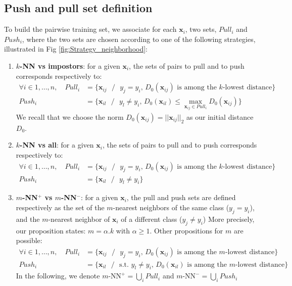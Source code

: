 \subsection{Push and pull set definition}
To build the pairwise training set, we associate for each $\textbf{x}_i$, two sets, $Pull_i$ and $Push_i$, where the two sets are chosen according to one of the following strategies, illustrated in Fig \ref{fig:Strategy_neighborhood}: 
\begin{enumerate}
	\item \textbf{$k$-NN vs impostors}: for a given $\textbf{x}_i$, the sets of pairs to pull and to push corresponds respectively to:
	\begin{align}
		\forall i\in 1, \ldots, n, \quad Pull_i & = \{\textbf{x}_{ij} \text{ } / \text{ }  \text{$y_j = y_i$, $D_0(\textbf{x}_{ij})$ is among the $k$-lowest distance} \} \label{eq:pull1}\\
		Push_i & = \{\textbf{x}_{il} \text{ } / \text{ } \text{$y_l \neq y_i$, } D_0(\textbf{x}_{il}) \leq \max\limits_{\textbf{x}_{ij} \in Pull_i} D_0(\textbf{x}_{ij})\} \label{eq:push1}
	\end{align}
	We recall that we choose the norm $D_0(\textbf{x}_{ij}) = ||\textbf{x}_{ij}||_2$ as our initial distance $D_0$.
	\item \textbf{$k$-NN vs all}: for a given $\textbf{x}_i$, the sets of pairs to pull and to push corresponds respectively to:	
	\begin{align}
	\forall i\in 1, \ldots, n, \quad Pull_i & = \{\textbf{x}_{ij} \text{ } / \text{ } \text{$y_j = y_i$, $D_0(\textbf{x}_{ij})$ is among the $k$-lowest distance} \} \\
	Push_i & = \{\textbf{x}_{il} \text{ } / \text{ } \text{$y_l \neq y_i$} \}
	\end{align}
	\item \textbf{$m$-NN$^+$ vs $m$-NN$^-$}: for a given $\textbf{x}_i$, the pull and push sets are defined respectively as 
	the set of the $m$-nearest neighbors of the same class ($y_j=y_i$), 
	and the $m$-nearest neighbor of $\textbf{x}_i$ of a different class ($y_j \neq y_i$)
	More precisely, our proposition states: $m=\alpha.k$ with $\alpha \geq 1$. Other propositions for $m$ are possible:
	\begin{align}
	\forall i\in 1, \ldots, n, \quad Pull_i & = \{\textbf{x}_{ij} \text{ } / \text{ } \text{$y_j = y_i$, $D_0(\textbf{x}_{ij})$ is among the $m$-lowest distance} \} \label{eq:mnn+}\\
	Push_i & = \{\textbf{x}_{il} \text{ } / \text{ } \text{s.t. $y_l \neq y_i$, $D_0(\textbf{x}_{il})$ is among the $m$-lowest distance} \} \label{eq:mnn-}
	\end{align}
	In the following, we denote $m\text{-NN}^+ = \bigcup\limits_{i} Pull_i$ and $m\text{-NN}^- = \bigcup\limits_{i} Push_i$
\end{enumerate}
